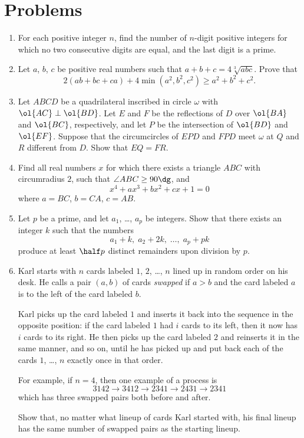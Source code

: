\documentclass[11pt]{scrartcl}
\begin{document}
\section{Problems}
\begin{enumerate}[\bfseries 1.]
\item %
For each positive integer $n$,
find the number of $n$-digit positive integers
for which no two consecutive digits are equal, and
the last digit is a prime.

\item %
Let $a$, $b$, $c$ be positive real numbers such that $a+b+c = 4\sqrt[3]{abc}$.
Prove that
\[ 2(ab+bc+ca) + 4 \min (a^2, b^2, c^2) \ge a^2 + b^2 + c^2. \]

\item %
Let $ABCD$ be a quadrilateral inscribed
in circle $\omega$ with $\ol{AC} \perp \ol{BD}$.
Let $E$ and $F$ be the reflections of $D$ over
$\ol{BA}$ and $\ol{BC}$, respectively, and let $P$ be
the intersection of $\ol{BD}$ and $\ol{EF}$.
Suppose that the circumcircles of $EPD$ and $FPD$
meet $\omega$ at $Q$ and $R$ different from $D$.
Show that $EQ = FR$.

\item %
Find all real numbers $x$ for which
there exists a triangle $ABC$ with circumradius $2$,
such that $\angle ABC \ge 90\dg$, and
\[ x^4 + ax^3 + bx^2 + cx + 1 = 0 \]
where $a = BC$, $b = CA$, $c = AB$.

\item %
Let $p$ be a prime, and let $a_1$, \dots, $a_p$ be integers.
Show that there exists an integer $k$ such that the numbers
\[ a_1 + k, \; a_2 + 2k, \; \dots, \; a_p + pk \]
produce at least $\half p$ distinct remainders upon division by $p$.

\item %
Karl starts with $n$ cards labeled $1$, $2$, \dots, $n$
lined up in random order on his desk.
He calls a pair $(a,b)$ of cards \emph{swapped} if $a > b$
and the card labeled $a$ is to the left of the card labeled $b$.

Karl picks up the card labeled $1$ and inserts it back into the sequence in
the opposite position: if the card labeled $1$ had $i$ cards to its left,
then it now has $i$ cards to its right.
He then picks up the card labeled $2$ and reinserts it in the same manner,
and so on, until he has picked up and put
back each of the cards $1$, \dots, $n$ exactly once in that order.

For example, if $n = 4$, then one example of a process is
\[ 3142 \longrightarrow 3412 \longrightarrow 2341 \longrightarrow 2431 \longrightarrow 2341 \]
which has three swapped pairs both before and after.

Show that, no matter what lineup of cards Karl started with,
his final lineup has the same number of swapped pairs as the starting lineup.

\end{enumerate}
\pagebreak
\end{document}
